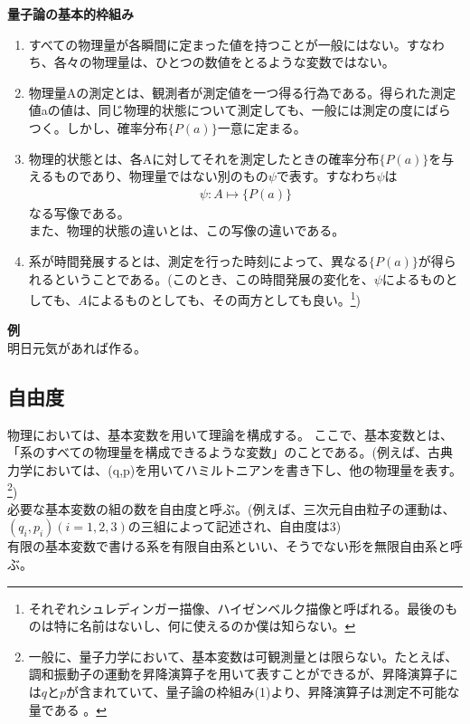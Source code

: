 \documentclass[a4paper,11pt]{jsarticle}
\begin{document}
\begin{itembox}[l]{\textbf{量子論の基本的枠組み}}
  \begin{enumerate}
    \item すべての物理量が各瞬間に定まった値を持つことが一般にはない。すなわち、各々の物理量は、ひとつの数値をとるような変数ではない。
    \item 物理量Aの測定とは、観測者が測定値を一つ得る行為である。得られた測定値aの値は、同じ物理的状態について測定しても、一般には測定の度にばらつく。しかし、確率分布$\{P(a)\}$一意に定まる。
\item 物理的状態とは、各Aに対してそれを測定したときの確率分布$\{P(a)\}$を与えるものであり、物理量ではない別のもの$\psi$で表す。すなわち$\psi$は
\begin{align}
\psi : A \mapsto \{P(a)\}
\end{align}
なる写像である。\\
また、物理的状態の違いとは、この写像の違いである。
\item 系が時間発展するとは、測定を行った時刻によって、異なる$\{P(a)\}$が得られるということである。(このとき、この時間発展の変化を、$\psi$によるものとしても、$A$によるものとしても、その両方としても良い。\footnote{それぞれシュレディンガー描像、ハイゼンベルク描像と呼ばれる。最後のものは特に名前はないし、何に使えるのか僕は知らない。})
  \end{enumerate}
\end{itembox}

\textbf{例}\\
明日元気があれば作る。

\newpage

\subsection{自由度}
物理においては、基本変数を用いて理論を構成する。
ここで、基本変数とは、「系のすべての物理量を構成できるような変数」のことである。(例えば、古典力学においては、(q,p)を用いてハミルトニアンを書き下し、他の物理量を表す。\footnote{一般に、量子力学において、基本変数は可観測量とは限らない。たとえば、調和振動子の運動を昇降演算子を用いて表すことができるが、昇降演算子には$q$と$p$が含まれていて、量子論の枠組み(1)より、昇降演算子は測定不可能な量である
。})\\
必要な基本変数の組の数を自由度と呼ぶ。(例えば、三次元自由粒子の運動は、$(q_i,p_i)(i=1,2,3)$の三組によって記述され、自由度は3)\\
有限の基本変数で書ける系を有限自由系といい、そうでない形を無限自由系と呼ぶ。\\
\end{document}
